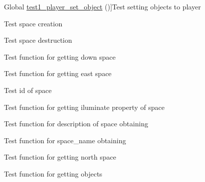\begin{DoxyRefList}
\hypertarget{test__test000117}{}%
Global \hyperlink{player__test_8c_ac8d8b030a98c0e44f4e98e08cda59537}{test1\+\_\+player\+\_\+set\+\_\+object} ()]Test setting objects to player  
\item[\label{test__test000121}%
\hypertarget{test__test000121}{}%
Global \hyperlink{space__test_8c_a69278cc022dc5688d4725f8d36317b30}{test1\+\_\+space\+\_\+create} ()]Test space creation  
\item[\label{test__test000123}%
\hypertarget{test__test000123}{}%
Global \hyperlink{space__test_8c_af3febdc46ce54799ebfcdbc4330ee93e}{test1\+\_\+space\+\_\+destroy} ()]Test space destruction  
\item[\label{test__test000180}%
\hypertarget{test__test000180}{}%
Global \hyperlink{space__test_8c_a31b56fea7bd46484d0e2e21dda7add5d}{test1\+\_\+space\+\_\+get\+\_\+down} ()]Test function for getting down space  
\item[\label{test__test000161}%
\hypertarget{test__test000161}{}%
Global \hyperlink{space__test_8c_a354adb2722b06ec65b7212d2736d6417}{test1\+\_\+space\+\_\+get\+\_\+east} ()]Test function for getting east space  
\item[\label{test__test000125}%
\hypertarget{test__test000125}{}%
Global \hyperlink{space__test_8c_a920df9e02482f4f1e6a5ebcaec523860}{test1\+\_\+space\+\_\+get\+\_\+id} ()]Test id of space  
\item[\label{test__test000168}%
\hypertarget{test__test000168}{}%
Global \hyperlink{space__test_8c_a43e340258ebc17b956c845dd0f4d93fa}{test1\+\_\+space\+\_\+get\+\_\+iluminate} ()]Test function for getting iluminate property of space  
\item[\label{test__test000143}%
\hypertarget{test__test000143}{}%
Global \hyperlink{space__test_8c_aaec8bbc606d2e3294f4efbe7c102d482}{test1\+\_\+space\+\_\+get\+\_\+long\+\_\+description} ()]Test function for description of space obtaining  
\item[\label{test__test000133}%
\hypertarget{test__test000133}{}%
Global \hyperlink{space__test_8c_ad12c42523c517507566c5c68b1527689}{test1\+\_\+space\+\_\+get\+\_\+name} ()]Test function for space\+\_\+name obtaining  
\item[\label{test__test000151}%
\hypertarget{test__test000151}{}%
Global \hyperlink{space__test_8c_a3a87f1e1e173d622bfbd3bcd14e060ca}{test1\+\_\+space\+\_\+get\+\_\+north} ()]Test function for getting north space  
\item[\label{test__test000147}%
\hypertarget{test__test000147}{}%
Global \hyperlink{space__test_8c_a4a1ca89fa511c04bb07c14edb19c17ba}{test1\+\_\+space\+\_\+get\+\_\+object} ()]Test function for getting objects  

\end{DoxyRefList}
